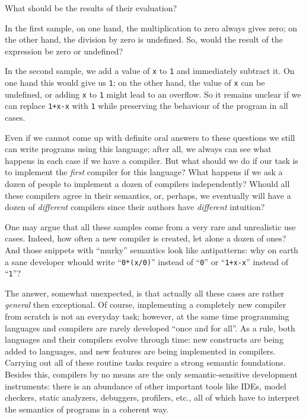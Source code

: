 \documentclass{article}
\begin{document}
What should be the results of their evaluation?

In the first sample, on one hand, the multiplication to zero always gives zero; on the other hand, the division by zero is undefined. So, would the result of
the expression be zero or undefined?

In the second sample, we add a value of \lstinline|x| to \lstinline|1| and immediately subtract it. On one hand this would give us \lstinline|1|; on the
other hand, the value of \lstinline|x| can be undefined, or adding \lstinline|x| to \lstinline|1| might lead to an overflow. So it remains unclear if we
can replace \lstinline|1+x-x| with \lstinline|1| while preserving the behaviour of the program in all cases.

Even if we cannot come up with definite oral answers to these questions we still can write programs using this language; after all, we always can
see what happens in each case if we have a compiler. But what should we do if our task is to implement the \emph{first} compiler for this language?
What happens if we ask a dozen of people to implement a dozen of compilers independently? Whould all these compilers agree in their semantics, or, perhaps, we
eventually will have a dozen of \emph{different} compilers since their authors have \emph{different} intuition? 

One may argue that all these samples come from a very rare and unrealistic use cases. Indeed, how often a new compiler is created, let alone a
dozen of ones? And those snippets with ``murky'' semantics look like antipatterns: why on earth a sane developer whould write ``\lstinline|0*(x/0)|''
instead of ``\lstinline|0|'' or ``\lstinline|1+x-x|'' instead of ``\lstinline|1|''?

The answer, somewhat unexpected, is that actually all these cases are rather \emph{general} then exceptional. Of course, implementing a completely new compiler from scratch is not an
everyday task; however, at the same time programming languages and compilers are rarely developed ``once and for all''. As a rule, both languages
and their compilers evolve through time: new constructs are being added to languages, and new features are being implemented in compilers. Carrying out all of
these routine tasks require a strong semantic foundations. Besides this, compilers by no means are the only semantic-sensitive development instruments:
there is an abundance of other important tools like IDEs, model checkers, static analyzers, debuggers, profilers, etc., all of which have to interpret the
semantics of programs in a coherent way.
\end{document}
